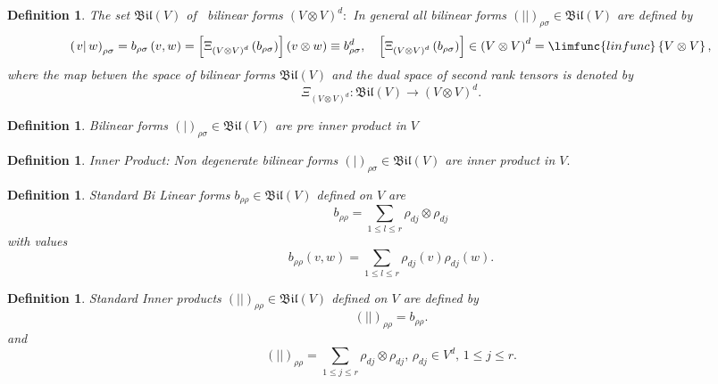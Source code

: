 \documentclass[aps,preprint]{revtex4}
\newtheorem{definition}[theorem]{Definition}
\begin{document}
\begin{definition}
The set $\mathfrak{Bil}\left( V\right) $ of \emph{\ bilinear forms }$\left(
V\otimes V\right) ^{d}:$ In general \emph{all bilinear forms} $\left(
\left\vert {}\right\vert \right) _{\rho \sigma }\in \mathfrak{Bil}\left(
V\right) $ are defined by 
\begin{equation}
\left( \left. v\right\vert w\right) _{\rho \sigma }=b_{\rho \sigma }\left(
v,w\right) =\left[ \Xi _{\left( V\otimes V\right) ^{d}}\left( b_{\rho \sigma
}\right) \right] \left( v\otimes w\right) \equiv b_{\rho \sigma }^{d},\quad %
\left[ \Xi _{\left( V\otimes V\right) ^{d}}\left( b_{\rho \sigma }\right) %
\right] \in \left( V\otimes V\right) ^{d}=\limfunc{linfunc}\left\{ V\otimes
V\right\} ,
\end{equation}%
where the map betwen the space of bilinear forms $\mathfrak{Bil}\left(
V\right) $ and the dual space of second rank tensors is denoted by 
\begin{equation}
\Xi _{\left( V\otimes V\right) ^{d}}:\mathfrak{Bil}\left( V\right)
\rightarrow \left( V\otimes V\right) ^{d}.
\end{equation}
\end{definition}

\begin{definition}
\emph{Bilinear forms} $\left( \left. {}\right\vert \right) _{\rho \sigma
}\in \mathfrak{Bil}\left( V\right) $ are \emph{pre} \emph{inner product} in $%
V$
\end{definition}

\begin{definition}
\emph{Inner Product: Non degenerate} \emph{bilinear forms} $\left( \left.
{}\right\vert \right) _{\rho \sigma }\in \mathfrak{Bil}\left( V\right) $ are 
\emph{inner product} in $V.$
\end{definition}

\begin{definition}
\emph{Standard Bi Linear forms} $b_{\rho \rho }\in \mathfrak{Bil}\left(
V\right) $ defined on $V$ are 
\begin{equation}
b_{\rho \rho }=\sum_{1\leq l\leq r}\rho _{dj}\otimes \rho _{dj}
\end{equation}%
with values 
\begin{equation}
b_{\rho \rho }\left( v,w\right) =\sum_{1\leq l\leq r}\rho _{dj}\left(
v\right) \rho _{dj}\left( w\right) .
\end{equation}
\end{definition}

\begin{definition}
\emph{Standard Inner products} \label{Standard Inner products} $\left(
\left\vert {}\right\vert \right) _{\rho \rho }\in \mathfrak{Bil}\left(
V\right) $ defined on $V$ are defined by%
\begin{equation}
\left( \left\vert {}\right\vert \right) _{\rho \rho }=b_{\rho \rho }.
\end{equation}
and 
\begin{equation}
\left( \left\vert {}\right\vert \right) _{\rho \rho }=\sum_{1\leq j\leq
r}\rho _{dj}\otimes \rho _{dj},\,\rho _{dj}\in V^{d},\,1\leq j\leq r.
\end{equation}
\end{definition}
\end{document}
